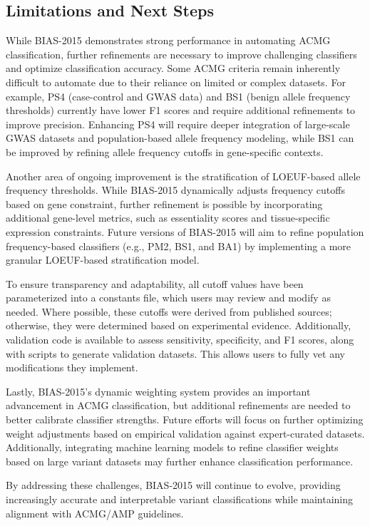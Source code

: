 \documentclass[unnumsec,webpdf,contemporary,large]{oup-authoring-template}
\theoremstyle{thmstyleone}
\theoremstyle{thmstyletwo}
\theoremstyle{thmstylethree}
\begin{document}
\subsection{Limitations and Next Steps}
While BIAS-2015 demonstrates strong performance in automating ACMG classification, further refinements are necessary to improve challenging classifiers and optimize classification accuracy. Some ACMG criteria remain inherently difficult to automate due to their reliance on limited or complex datasets. For example, PS4 (case-control and GWAS data) and BS1 (benign allele frequency thresholds) currently have lower F1 scores and require additional refinements to improve precision. Enhancing PS4 will require deeper integration of large-scale GWAS datasets and population-based allele frequency modeling, while BS1 can be improved by refining allele frequency cutoffs in gene-specific contexts.

Another area of ongoing improvement is the stratification of LOEUF-based allele frequency thresholds. While BIAS-2015 dynamically adjusts frequency cutoffs based on gene constraint, further refinement is possible by incorporating additional gene-level metrics, such as essentiality scores and tissue-specific expression constraints. Future versions of BIAS-2015 will aim to refine population frequency-based classifiers (e.g., PM2, BS1, and BA1) by implementing a more granular LOEUF-based stratification model. 

To ensure transparency and adaptability, all cutoff values have been parameterized into a constants file, which users may review and modify as needed. Where possible, these cutoffs were derived from published sources; otherwise, they were determined based on experimental evidence. Additionally, validation code is available to assess sensitivity, specificity, and F1 scores, along with scripts to generate validation datasets. This allows users to fully vet any modifications they implement.

Lastly, BIAS-2015’s dynamic weighting system provides an important advancement in ACMG classification, but additional refinements are needed to better calibrate classifier strengths. Future efforts will focus on further optimizing weight adjustments based on empirical validation against expert-curated datasets. Additionally, integrating machine learning models to refine classifier weights based on large variant datasets may further enhance classification performance.

By addressing these challenges, BIAS-2015 will continue to evolve, providing increasingly accurate and interpretable variant classifications while maintaining alignment with ACMG/AMP guidelines.
\end{document}
